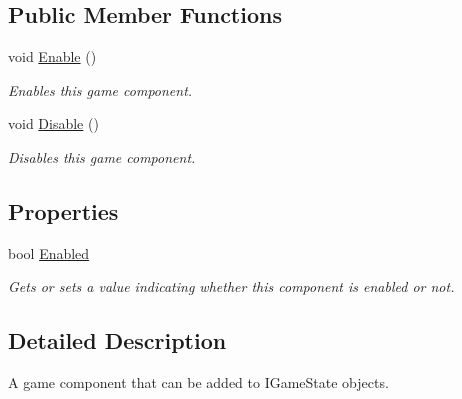 \subsection*{Public Member Functions}
\begin{DoxyCompactItemize}
\item 
void \hyperlink{interface_tri_devs_1_1_tri_engine_1_1_interfaces_1_1_i_game_component_a46af9ee42046dc4b9ceb64eec3ac19e0}{Enable} ()
\begin{DoxyCompactList}\small\item\em Enables this game component. \end{DoxyCompactList}\item 
void \hyperlink{interface_tri_devs_1_1_tri_engine_1_1_interfaces_1_1_i_game_component_aceaad156f42fe7bfc33a256e4f2bf4f7}{Disable} ()
\begin{DoxyCompactList}\small\item\em Disables this game component. \end{DoxyCompactList}\end{DoxyCompactItemize}
\subsection*{Properties}
\begin{DoxyCompactItemize}
\item 
bool \hyperlink{interface_tri_devs_1_1_tri_engine_1_1_interfaces_1_1_i_game_component_aa10a307cba842ae0adf80a72a03afb80}{Enabled}
\begin{DoxyCompactList}\small\item\em Gets or sets a value indicating whether this component is enabled or not. \end{DoxyCompactList}\end{DoxyCompactItemize}


\subsection{Detailed Description}
A game component that can be added to I\-Game\-State objects. 



